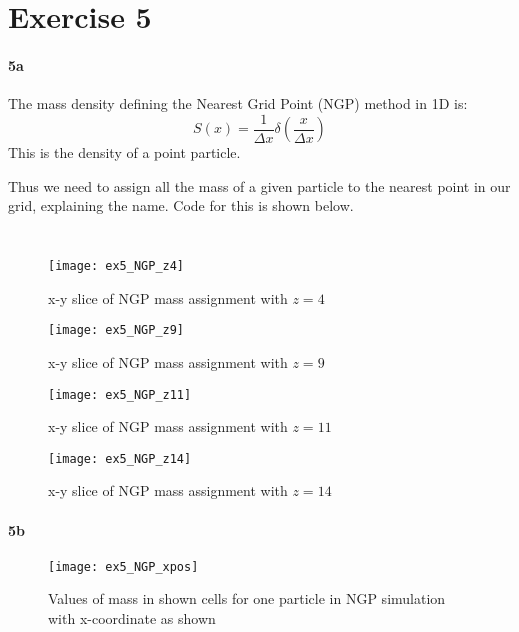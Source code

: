 \section*{Exercise 5}
\paragraph{5a}
The mass density defining the Nearest Grid Point (NGP) method in 1D is:
\begin{equation}
    S(x) = \frac{1}{\Delta x} \delta \left(\frac{x}{\Delta x}\right)
\end{equation}
This is the density of a point particle.

Thus we need to assign all the mass of a given particle to the nearest point in our grid, explaining the name.
Code for this is shown below.

\inputminted[firstline=10, lastline=19]{Python}{../pm_utils.py}
\inputminted[firstline=8, lastline=38]{Python}{../ex5.py}

\begin{figure}[h]
  \centering
  \texttt{[image: ex5\_NGP\_z4]}
  \caption{x-y slice of NGP mass assignment with $z=4$}
\end{figure}

\begin{figure}[h]
  \centering
  \texttt{[image: ex5\_NGP\_z9]}
  \caption{x-y slice of NGP mass assignment with $z=9$}
\end{figure}

\begin{figure}[h]
  \centering
  \texttt{[image: ex5\_NGP\_z11]}
  \caption{x-y slice of NGP mass assignment with $z=11$}
\end{figure}

\begin{figure}[h]
  \centering
  \texttt{[image: ex5\_NGP\_z14]}
  \caption{x-y slice of NGP mass assignment with $z=14$}
\end{figure}

\clearpage
\paragraph{5b}
\begin{figure}[h]
  \centering
  \texttt{[image: ex5\_NGP\_xpos]}
  \caption{Values of mass in shown cells for one particle in NGP simulation with x-coordinate as shown}
\end{figure}


